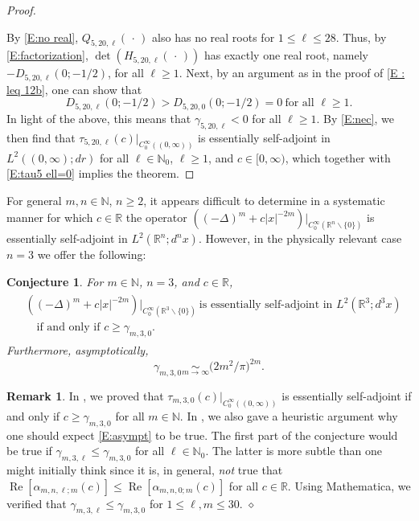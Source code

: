 \documentclass[reqno,11pt,centertags]{amsart}
\newcommand{\bbN}{{\mathbb{N}}}
\newcommand{\bbR}{{\mathbb{R}}}
\newcommand{\<}{\langle}
\renewcommand{\>}{\rangle}
\newcommand{\lb}{\label}
\newcommand{\dott}{\,\cdot\,}
\renewcommand{\Re}{\operatorname{Re}}
\numberwithin{equation}{section}
\newtheorem{conjecture}[theorem]{Conjecture}
\theoremstyle{definition}
\newtheorem{remark}[theorem]{Remark}
\begin{document}
\begin{proof}
\begin{table}[H]
\lb{T: signs} 
\end{table}
%
\noindent
By \eqref{E:no real},   $Q_{5,20,\ell}(\dott)$  also has no real roots for $1\leq \ell \leq 28$.
Thus, by \eqref{E:factorization},   $\det (H_{5,20,\ell}(\dott))$ has exactly one real root, namely $-D_{5,20,\ell}(0; -1/2)$, for all $\ell\geq 1$.
 Next, by an argument as in the proof of \eqref{E : leq 12b}, one can show that 
\begin{equation}
 D_{5,20,\ell}(0; -1/2)>D_{5,20,0}(0; -1/2)=0\ \mbox{for all $\ell\geq 1$.}
\end{equation}
In light of the above, this means that $\gamma_{5,20,\ell} < 0$ for all $\ell\geq 1$. By \eqref{E:nec}, we then find that
 $\tau_{5,20,\ell}(c)\big|_{C_0^{\infty}((0,\infty))}$ is essentially self-adjoint in $L^2((0,\infty);dr)$ for all $\ell\in \bbN_0$, $\ell\geq 1$, and  $c\in [0,\infty)$, which
together with \eqref{E:tau5 ell=0} implies the theorem.
\end{proof}

For general $m,n\in \bbN$, $n\geq 2$, it appears difficult to determine in a systematic manner for which $c\in \bbR$ the operator $\left((-\Delta)^m +c|x|^{-2m}\right)\big|_{C_0^{\infty}(\bbR^n \backslash \{0\})}$ is essentially self-adjoint in $L^2(\bbR^n;d^nx)$. However, in the physically relevant case $n=3$ we offer the following:

\begin{conjecture} \lb{c4.5}
For $m\in \bbN$, $n=3$, and $c\in \bbR$,
\begin{align}
\begin{split}
& \left((-\Delta)^m +c|x|^{-2m}\right)\big|_{C_0^{\infty}(\bbR^3 \backslash \{0\})}\ \mbox{is essentially self-adjoint  in $L^2( \bbR^3; d^3x)$}  \\
& \quad \text{if and only if   $c\geq \gamma_{m,3,0}$.}
\end{split}
\end{align} 
Furthermore, asymptotically,
\begin{equation}\lb{E:asympt}
\gamma_{m,3,0} \underset{m\to\infty}{\sim}  \big(2m^2\big/\pi\big)^{2m}.
\end{equation}
\end{conjecture}

\begin{remark} \lb{r4.6} 
In \cite{GHT23},  we proved that  $\tau_{m,3,0}(c)\big|_{C_0^{\infty}((0,\infty))}$  is essentially self-adjoint  if and only if $c\geq \gamma_{m,3,0}$ for all $m\in \bbN$.
In \cite[Appendix]{GHT23}, we also gave 
a heuristic argument why one should expect \eqref{E:asympt} to be true.
The first part of the conjecture would be true if   $\gamma_{m,3,\ell}\leq \gamma_{m,3,0}$ for all $\ell \in \bbN_0$. The latter is more subtle than one might initially think since
it is, in general, \emph{not} true that $\Re [\alpha_{m,n,\ell;m}(c)] \leq \Re [\alpha_{m,n,0;m}(c)]$ for all $c\in \bbR$. Using Mathematica, we verified that $\gamma_{m,3,\ell}\leq \gamma_{m,3,0}$ for $1\leq \ell,m\leq 30$. 
\hfill $\diamond$ 
\end{remark}
\end{document}
